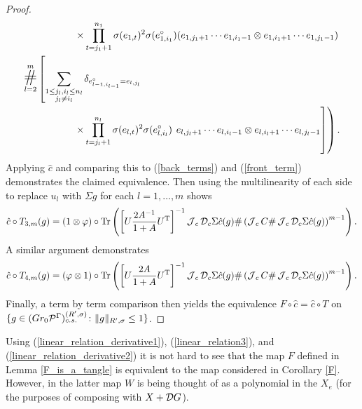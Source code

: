 \begin{proof}
\begin{align*}
			\times&\prod_{t=j_1+1}^{n_1}\sigma(e_{1,t})^2 \sigma(e_{1,i_1}^\circ) (e_{1,j_1+1}\cdots e_{1,i_1-1}\otimes e_{1,i_1+1}\cdots e_{1,j_1-1})\\
			\mathop{\text{\LARGE{\#}}}_{l=2}^m \left[ \sum_{\substack{1\leq j_l,i_l\leq n_l\\ j_l\neq i_l}}\right.& \delta_{e_{l-1,i_{l-1}}^\circ=e_{l,j_l}}\\
			\times&\prod_{t=j_l+1}^{n_l}\sigma(e_{l,t})^2 \sigma(e_{l,i_l}^\circ)\left.\left. \vphantom{\prod_{l=2}^m \sum_{\substack{1\leq j_l,i_l\leq n\\ j_l\neq i_l}} \delta_{e=e_{l,j_l}}} e_{l,j_l+1}\cdots e_{l,i_l-1}\otimes e_{l,i_l+1}\cdots e_{l,j_l-1}\right]\right).
	\end{align*}
Applying $\hat c$ and comparing this to (\ref{back_terms}) and (\ref{front_term}) demonstrates the claimed equivalence. Then using the multilinearity of each side to replace $u_l$ with $\Sigma g$ for each $l=1,\ldots, m$ shows
\begin{align*}
\hat c\circ T_{3,m}(g)=(1\otimes \varphi)\circ\text{Tr}\left(\left[U \frac{2A^{-1}}{1+A} U^\text{T}\right]^{-1} \operatorname{\mathcal J}_c\mathcal D_c \Sigma\hat c(g)\# \left(\operatorname{\mathcal J}_c C \# \operatorname{\mathcal J}_c \mathcal D_c \Sigma \hat c(g)\right)^{m-1}\right).
\end{align*}
A similar argument demonstrates
\begin{align*}
\hat c\circ T_{4,m}(g)=(\varphi\otimes 1)\circ\text{Tr}\left(\left[U\frac{2A}{1+A} U^{\text{T}}\right]^{-1} \operatorname{\mathcal J}_c\mathcal D_c \Sigma \hat c(g) \# \left(\operatorname{\mathcal J}_c C \# \operatorname{\mathcal J}_c\mathcal D_c \Sigma \hat c(g)\right)^{m-1}\right).
\end{align*}
Finally, a term by term comparison then yields the equivalence $F\circ \hat c=\hat c\circ T$ on $\{g\in (Gr_0 \mathcal{P}^\Gamma)^{(R',\sigma)}_{c.s.}\colon \|g\|_{R',\sigma}\leq 1\}$.
\end{proof}

Using (\ref{linear_relation_derivative1}), (\ref{linear_relation3}), and (\ref{linear_relation_derivative2}) it is not hard to see that the map $F$ defined in Lemma \ref{F_is_a_tangle} is equivalent to the map considered in Corollary \ref{F}. However, in the latter map $W$ is being thought of as a polynomial in the $X_e$ (for the purposes of composing with $X+\mathcal D G$).

